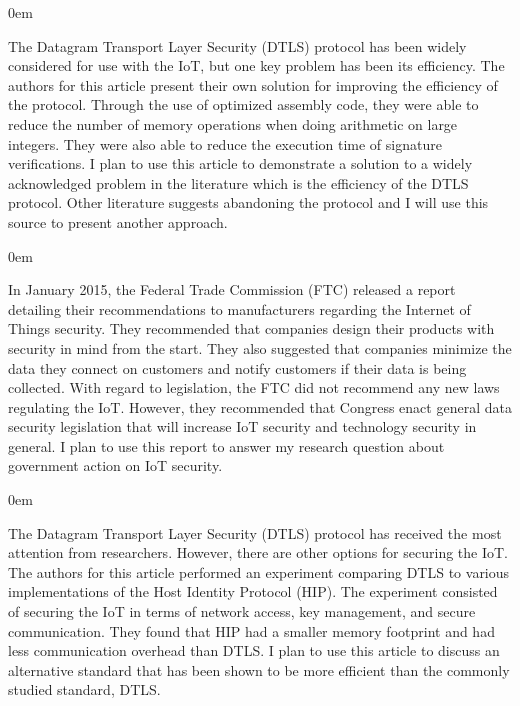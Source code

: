 \documentclass{article}
\newenvironment{annotation}{\begin{addmargin}[2.5em]{0em} \begin{flushleft}}{\end{flushleft} \end{addmargin}}
\begin{document}
\begin{annotation}
The Datagram Transport Layer Security (DTLS) protocol has been widely considered for use with the IoT, but one key problem has been its efficiency. The authors for this article present their
own solution for improving the efficiency of the protocol. Through the use of optimized assembly code, they were able to reduce the number of memory operations when doing arithmetic on large
integers. They were also able to reduce the execution time of signature verifications. I plan to use this article to demonstrate a solution to a widely acknowledged problem in the literature which
is the efficiency of the DTLS protocol. Other literature suggests abandoning the protocol and I will use this source to present another approach. 
\end{annotation}

\begin{annotation}
In January 2015, the Federal Trade Commission (FTC) released a report detailing their recommendations to manufacturers regarding the Internet of Things security. They recommended that companies design their
products with security in mind from the start. They also suggested that companies minimize the data they connect on customers and notify customers if their data is being collected. With regard to 
legislation, the FTC did not recommend any new laws regulating the IoT. However, they recommended that Congress enact general data security legislation that will increase IoT security and technology 
security in general. I plan to use this report to answer my research question about government action on IoT security.
\end{annotation}

\begin{annotation}
The Datagram Transport Layer Security (DTLS) protocol has received the most attention from researchers. However, there are other options for securing the IoT. The authors for this article performed an 
experiment comparing DTLS to various implementations of the Host Identity Protocol (HIP). The experiment consisted of securing the IoT in terms of network access, key management, and secure communication.
They found that HIP had a smaller memory footprint and had less communication overhead than DTLS. I plan to use this article to discuss an alternative standard that has been shown to be more efficient
than the commonly studied standard, DTLS.
\end{annotation}
\end{document}
